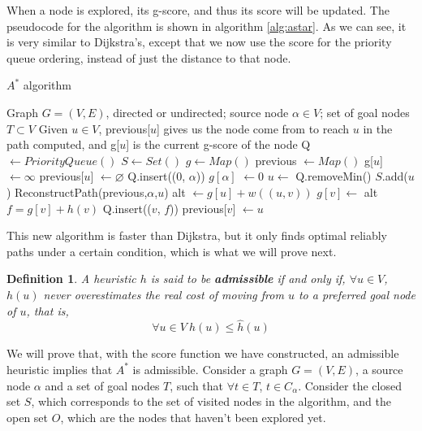 \documentclass[a4paper,10pt]{report}
\newtheorem{definition}[theorem]{Definition}
\begin{document}
When a node is explored, its g-score, and thus its score will be updated. The pseudocode for the algorithm is shown in algorithm \ref{alg:astar}. As we can see, it is very similar to Dijkstra's, except that we now use the score for the priority queue ordering, instead of just the distance to that node.

\begin{algorithm}
\caption{$A^*$ algorithm}
\label{alg:astar}
\begin{algorithmic}[1]
\Require Graph $G = (V, E)$, directed or undirected; source node $\alpha \in V$; set of goal nodes $T \subset V$
\Ensure Given $u \in V$, previous[$u$] gives us the node come from to reach $u$ in the path computed, and g[$u$] is the current g-score of the node
\State Q $\gets PriorityQueue()$
\State $S \gets Set()$
\State $g \gets Map()$
\State previous $\gets Map()$
	\State g[$u$] $\gets \infty$
	\State previous[$u$] $\gets \varnothing$
\EndFor
\State Q.insert((0, $\alpha$))
\State $g[\alpha]$ $\gets 0$
	\State $u \gets$ Q.removeMin()
	\State $S$.add($u$)
	 
		\State \Return ReconstructPath(previous,$\alpha$,$u$)
	\EndIf
		\State alt $\gets g[u] + w((u, v))$
			\State $g[v] \gets$ alt 
			\State $f = g[v] + h(v)$
			\State Q.insert(($v$, $f$))
			\State previous[$v$] $\gets u$
		\EndIf
	\EndFor
\EndWhile
\EndProcedure
\end{algorithmic}
\end{algorithm}

This new algorithm is faster than Dijkstra, but it only finds optimal reliably paths under a certain condition, which is what we will prove next.

\begin{definition}
A heuristic $h$ is said to be \textbf{admissible} if and only if, $\forall u \in V$, $h(u)$ never overestimates the real cost of moving from $u$ to a preferred goal node of $u$, that is, 
\[ \forall u \in V \ h(u) \le \hat{h}(u) \]
\end{definition}

We will prove that, with the score function we have constructed, an admissible heuristic implies that $A^*$ is admissible. Consider a graph $G = (V, E)$, a source node $\alpha$ and a set of goal nodes $T$, such that $\forall t \in T$, $t \in C_\alpha$. Consider the closed set $S$, which corresponds to the set of visited nodes in the algorithm, and the open set $O$, which are the nodes that haven't been explored yet.
\end{document}
